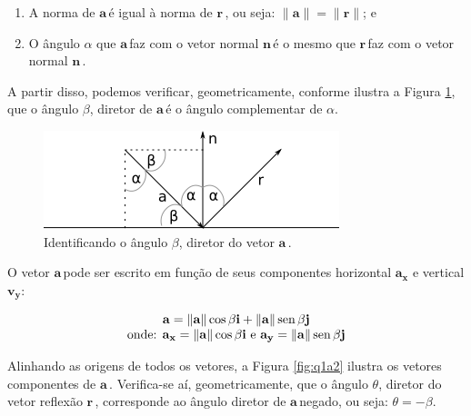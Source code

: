 \documentclass[a4paper,11pt,pagenumber=true]{article}
\newcommand{\veca}{$\mathbf{a\,}$}
\newcommand{\vecr}{$\mathbf{r\,}$}
\newcommand{\vecn}{$\mathbf{n\,}$}
\newcommand{\vecnorm}[1]{\|\mathbf{#1}\|}
\renewcommand{\sin}{\text{\,sen\,}}
\theoremstyle{mytheor}
\begin{document}
            \begin{enumerate}
                \item A norma de \veca é igual à norma de \vecr, ou seja: $\vecnorm{a} = \vecnorm{r}$; e
                \item O ângulo $\alpha$ que \veca faz com o vetor normal \vecn é o mesmo que \vecr faz com o vetor normal \vecn.
            \end{enumerate}
            
            A partir disso, podemos verificar, geometricamente, conforme ilustra a Figura \ref{fig:q1a1}, que o ângulo $\beta$, diretor de \veca é o ângulo complementar de $\alpha$. 

            \begin{figure}[h]
                \centering
                \includegraphics{images/Q-1-A-1.png}
                \caption{Identificando o ângulo $\beta$, diretor do vetor \veca.}
                \label{fig:q1a1}
            \end{figure}

            O vetor \veca pode ser escrito em função de seus componentes horizontal $\mathbf{a_x}$ e vertical $\mathbf{v_y}$:
            
            \begin{equation}
                \begin{matrix}
                    \mathbf{a} = \vecnorm{a} \cos \beta \mathbf{i} + \vecnorm{a} \sin \beta \mathbf{j} \\
                    \text{onde: } 
                        \mathbf{a_x} = \vecnorm{a} \cos \beta \mathbf{i} \text{ e } 
                        \mathbf{a_y} = \vecnorm{a} \sin \beta \mathbf{j}
                \end{matrix}
                \label{eq:a}
            \end{equation} 

            Alinhando as origens de todos os vetores, a Figura \ref{fig:q1a2} ilustra os vetores componentes de \veca. Verifica-se aí, geometricamente, que o ângulo $\theta$, diretor do vetor reflexão \vecr, corresponde ao ângulo diretor de \veca negado, ou seja: $\theta = -\beta$.
            
\end{document}
